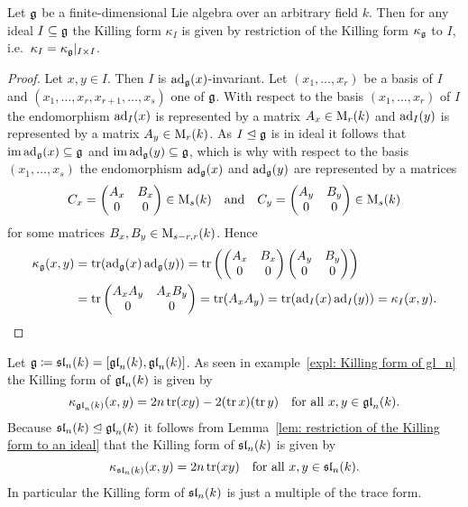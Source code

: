 \begin{lem}\label{lem: restriction of the Killing form to an ideal}
 Let $\mathfrak{g}$ be a finite-dimensional Lie algebra over an arbitrary field $k$. Then for any ideal $I \subseteq \mathfrak{g}$ the Killing form $\kappa_I$ is given by restriction of the Killing form $\kappa_{\mathfrak{g}}$ to $I$, i.e.\ $\kappa_I = \kappa_{\mathfrak{g}}|_{I \times I}$.
\end{lem}
\begin{proof}
 Let $x, y \in I$. Then $I$ is $\operatorname{ad}_{\mathfrak{g}}(x)$-invariant. Let $(x_1, \dotsc, x_r)$ be a basis of $I$ and $(x_1, \dotsc, x_r, x_{r+1}, \dotsc, x_s)$ one of $\mathfrak{g}$. With respect to the basis $(x_1, \dotsc, x_r)$ of $I$ the endomorphism $\operatorname{ad}_I(x)$ is represented by a matrix $A_x \in \operatorname{M}_r(k)$ and $\operatorname{ad}_I(y)$ is represented by a matrix $A_y \in \operatorname{M}_r(k)$. As $I \trianglelefteq \mathfrak{g}$ is in ideal it follows that $\operatorname{im} \operatorname{ad}_{\mathfrak{g}}(x) \subseteq \mathfrak{g}$ and $\operatorname{im} \operatorname{ad}_{\mathfrak{g}}(y) \subseteq \mathfrak{g}$, which is why with respect to the basis $(x_1, \dotsc, x_s)$ the endomorphism $\operatorname{ad}_{\mathfrak{g}}(x)$ and $\operatorname{ad}_{\mathfrak{g}}(y)$ are represented by a matrices
 \[
  C_x = \begin{pmatrix} A_x & B_x \\ 0 & 0 \end{pmatrix} \in \operatorname{M}_s(k)
  \quad\text{and}\quad
  C_y = \begin{pmatrix} A_y & B_y \\ 0 & 0 \end{pmatrix} \in \operatorname{M}_s(k)
 \]
 for some matrices $B_x, B_y \in \operatorname{M}_{s-r,r}(k)$. Hence
 \begin{align*}
  \kappa_{\mathfrak{g}}(x,y)
  &= \operatorname{tr}(\operatorname{ad}_{\mathfrak{g}}(x) \operatorname{ad}_{\mathfrak{g}}(y))
  = \operatorname{tr}\left( \begin{pmatrix} A_x & B_x \\ 0 & 0 \end{pmatrix} \begin{pmatrix} A_y & B_y \\ 0 & 0 \end{pmatrix} \right) \\
  &= \operatorname{tr} \begin{pmatrix} A_x A_y & A_x B_y \\ 0 & 0 \end{pmatrix}
  = \operatorname{tr}(A_x A_y)
  = \operatorname{tr}(\operatorname{ad}_I(x) \operatorname{ad}_I(y))
  = \kappa_I(x,y).
 \qedhere
 \end{align*}
\end{proof}




\begin{expl}
 Let $\mathfrak{g} \coloneqq \mathfrak{sl}_n(k) = [\mathfrak{gl}_n(k), \mathfrak{gl}_n(k)]$. As seen in example~\ref{expl: Killing form of gl_n} the Killing form of $\mathfrak{gl}_n(k)$ is given by
 \[
  \kappa_{\mathfrak{gl}_n(k)}(x,y) = 2n \operatorname{tr}(xy) - 2(\operatorname{tr} x)(\operatorname{tr} y)
  \quad \text{for all $x,y \in \mathfrak{gl}_n(k)$}.
 \]
 Because $\mathfrak{sl}_n(k) \trianglelefteq \mathfrak{gl}_n(k)$ it follows from Lemma~\ref{lem: restriction of the Killing form to an ideal} that the Killing form of $\mathfrak{sl}_n(k)$ is given by
 \[
  \kappa_{\mathfrak{sl}_n(k)}(x,y) = 2n \operatorname{tr}(xy) \quad \text{for all $x,y \in \mathfrak{sl}_n(k)$}.
 \]
 In particular the Killing form of $\mathfrak{sl}_n(k)$ is just a multiple of the trace form.
\end{expl}


